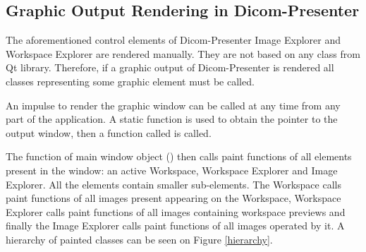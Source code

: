 \subsection{Graphic Output Rendering in Dicom-Presenter}
\label{renderingprocess}
The aforementioned control elements of Dicom-Presenter Image Explorer and Workspace Explorer are rendered manually. They are not based on any class from Qt library. Therefore, if a graphic output of Dicom-Presenter is rendered all classes representing some graphic element must be called. 

An impulse to render the graphic window can be called at any time from any part of the application. A static function is used to obtain the pointer to the output window, then a function called  is called.

The  function of main window object () then calls paint functions of all elements present in the window: an active Workspace, Workspace Explorer and Image Explorer. All the elements contain smaller sub-elements. The Workspace calls paint functions of all images present appearing on the Workspace, Workspace Explorer calls paint functions of all images containing workspace previews and finally the Image Explorer calls paint functions of all images operated by it. A hierarchy of painted classes can be seen on Figure \ref{hierarchy}.

